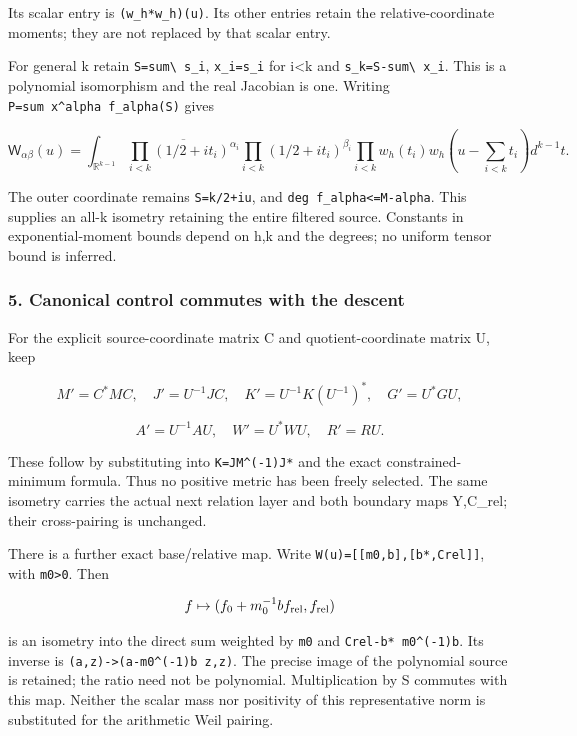Its scalar entry is \nolinkurl{(w_h*w_h)(u)}. Its other entries retain the relative-coordinate
moments; they are not replaced by that scalar entry.

For general k retain \nolinkurl{S=sum\ s_i}, \nolinkurl{x_i=s_i} for i\textless k and
\nolinkurl{s_k=S-sum\ x_i}. This is a polynomial isomorphism and the real Jacobian is one. Writing
\texttt{P=sum\ x\^{}alpha\ f\_alpha(S)} gives

\[\mathsf W_{\alpha\beta}(u)=\int_{\mathbb R^{k-1}}\overline{\prod_{i<k}(1/2+it_i)^{\alpha_i}}\prod_{i<k}(1/2+it_i)^{\beta_i}\prod_{i<k}w_h(t_i)w_h(u-\sum_{i<k}t_i)d^{k-1}t.\]

The outer coordinate remains \nolinkurl{S=k/2+iu}, and
\texttt{deg\ f\_alpha\textless{}=M-\textbar{}alpha\textbar{}}. This supplies an all-k isometry
retaining the entire filtered source. Constants in exponential-moment bounds depend on h,k and the
degrees; no uniform tensor bound is inferred.

\subsubsection{5. Canonical control commutes with the
descent}\label{pr_17:canonical-control-commutes-with-the-descent}

For the explicit source-coordinate matrix C and quotient-coordinate matrix U, keep

\[M'=C^*MC,\quad J'=U^{-1}JC,\quad K'=U^{-1}K(U^{-1})^*,\quad G'=U^*GU,\]

\[A'=U^{-1}AU,\quad W'=U^*WU,\quad R'=RU.\]

These follow by substituting into \texttt{K=JM\^{}(-1)J*} and the exact constrained-minimum formula.
Thus no positive metric has been freely selected. The same isometry carries the actual next relation
layer and both boundary maps Y,C\_rel; their cross-pairing is unchanged.

There is a further exact base/relative map. Write \texttt{W(u)={[}{[}m0,b{]},{[}b*,Crel{]}{]}}, with
\texttt{m0\textgreater{}0}. Then

\[f\mapsto(f_0+m_0^{-1}bf_{\rm rel},f_{\rm rel})\]

is an isometry into the direct sum weighted by \nolinkurl{m0} and \texttt{Crel-b*\ m0\^{}(-1)b}. Its
inverse is \texttt{(a,z)-\textgreater{}(a-m0\^{}(-1)b\ z,z)}. The precise image of the polynomial
source is retained; the ratio need not be polynomial. Multiplication by S commutes with this map.
Neither the scalar mass nor positivity of this representative norm is substituted for the arithmetic
Weil pairing.

